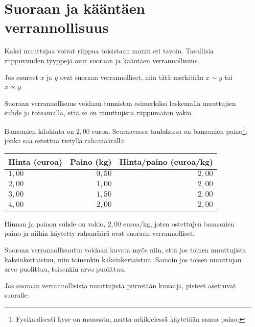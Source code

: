 \section{Suoraan ja kääntäen verrannollisuus}

Kaksi muuttujaa voivat riippua toisistaan monin eri tavoin. Tavallisia
riippuvuuden tyyppejä ovat suoraan ja kääntäen verrannollisuus.


Jos suureet $x$ ja $y$ ovat suoraan verrannolliset, niin tätä merkitään $x\sim y$ tai $x\propto y$.

Suoraan verrannollisuus voidaan tunnistaa esimerkiksi laskemalla muuttujien
suhde ja toteamalla, että se on muuttujista riippumaton vakio.

\begin{esimerkki}
Banaanien kilohinta on $2,00$ euroa. Seuraavassa taulukossa on
banaanien paino\footnote{Fysikaalisesti kyse on massasta, mutta
arkikielessä käytetään sanaa paino.}, jonka saa ostettua tietyllä rahamäärällä:
\begin{center} 
\begin{tabular}{|l|r|r|}
\hline
Hinta (euroa) & Paino (kg) & Hinta/paino (euroa/kg) \\
\hline
$1,00$ & $0,50$ & $2,00$ \\
$2,00$ & $1,00$ & $2,00$ \\
$3,00$ & $1,50$ & $2,00$ \\
$4,00$ & $2,00$ & $2,00$ \\
\hline
\end{tabular}
\end{center}
Hinnan ja painon suhde on vakio, $2,00$ euroa/kg, joten ostettujen
banaanien paino ja niihin käytetty rahamäärä ovat suoraan verrannolliset.
\end{esimerkki}

Suoraan verrannollisuutta voidaan kuvata myös niin, että jos
toinen muuttujista kaksinkertaistuu, niin toinenkin kaksinkertaistuu.
Samoin jos toisen muuttujan arvo puolittuu, toisenkin arvo puolittuu.

Jos suoraan verrannollisista muuttujista piirretään kuvaaja, pisteet
asettuvat suoralle:


